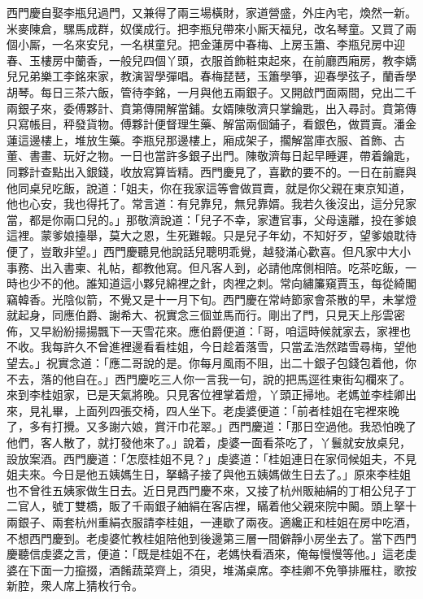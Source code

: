 西門慶自娶李瓶兒過門，又兼得了兩三場橫財，家道營盛，外庄內宅，煥然一新。米麥陳倉，騾馬成群，奴僕成行。把李瓶兒帶來小厮天福兒，改名琴童。又買了兩個小厮，一名來安兒，一名棋童兒。把金蓮房中春梅、上房玉簫、李瓶兒房中迎春、玉樓房中蘭香，一般兒四個丫頭，衣服首飾粧束起來，在前廳西廂房，教李嬌兒兄弟樂工李銘來家，教演習學彈唱。{}春梅琵琶，玉簫學箏，迎春學弦子，蘭香學胡琴。每日三茶六飯，管待李銘，一月與他五兩銀子。又開啟門面兩間，兌出二千兩銀子來，委傅夥計、賁第傳開解當鋪。女婿陳敬濟只掌鑰匙，出入尋討。賁第傳只寫帳目，秤發貨物。傅夥計便督理生藥、解當兩個鋪子，看銀色，做買賣。潘金蓮這邊樓上，堆放生藥。李瓶兒那邊樓上，廂成架子，擱解當庫衣服、首飾、古董、書畫、玩好之物。一日也當許多銀子出門。陳敬濟每日起早睡遲，帶着鑰匙，同夥計查點出入銀錢，收放寫算皆精。西門慶見了，喜歡的要不的。一日在前廳與他同桌兒吃飯，說道：「姐夫，你在我家這等會做買賣，就是你父親在東京知道，他也心安，我也得托了。常言道：有兒靠兒，無兒靠婿。我若久後沒出，這分兒家當，都是你兩口兒的。」{}那敬濟說道：「兒子不幸，家遭官事，父母遠離，投在爹娘這裡。蒙爹娘擡舉，莫大之恩，生死難報。只是兒子年幼，不知好歹，望爹娘耽待便了，豈敢非望。」西門慶聽見他說話兒聰明乖覺，越發滿心歡喜。但凡家中大小事務、出入書柬、礼帖，都教他寫。但凡客人到，必請他席側相陪。吃茶吃飯，一時也少不的他。誰知道這小夥兒綿裡之針，肉裡之刺。常向繡簾窺賈玉，每從綺閣竊韓香。光陰似箭，不覺又是十一月下旬。西門慶在常峙節家會茶散的早，未掌燈就起身，同應伯爵、謝希大、祝實念三個並馬而行。剛出了門，只見天上彤雲密佈，又早紛紛揚揚飄下一天雪花來。應伯爵便道：「哥，咱這時候就家去，家裡也不收。我每許久不曾進裡邊看看桂姐，今日趁着落雪，只當孟浩然踏雪尋梅，望他望去。」祝實念道：「應二哥說的是。你每月風雨不阻，出二十銀子包錢包着他，{}你不去，落的他自在。」西門慶吃三人你一言我一句，說的把馬逕徃東街勾欄來了。來到李桂姐家，已是天氣將晚。只見客位裡掌着燈，丫頭正掃地。老媽並李桂卿出來，見礼畢，上面列四張交椅，四人坐下。老虔婆便道：「前者桂姐在宅裡來晚了，多有打攪。又多謝六娘，賞汗巾花翠。」西門慶道：「那日空過他。我恐怕晚了他們，客人散了，就打發他來了。」說着，虔婆一面看茶吃了，丫鬟就安放桌兒，設放案酒。西門慶道：「怎麼桂姐不見？」虔婆道：「桂姐連日在家伺候姐夫，不見姐夫來。今日是他五姨媽生日，拏轎子接了與他五姨媽做生日去了。」原來李桂姐也不曾徃五姨家做生日去。近日見西門慶不來，又接了杭州販紬絹的丁相公兒子丁二官人，號丁雙橋，販了千兩銀子紬絹在客店裡，瞞着他父親來院中闝。頭上拏十兩銀子、兩套杭州重絹衣服請李桂姐，一連歇了兩夜。適纔正和桂姐在房中吃酒，不想西門慶到。老虔婆忙教桂姐陪他到後邊第三層一間僻靜小房坐去了。當下西門慶聽信虔婆之言，便道：「既是桂姐不在，老媽快看酒來，俺每慢慢等他。」這老虔婆在下面一力攛掇，酒餚蔬菜齊上，須臾，堆滿桌席。李桂卿不免箏排雁柱，歌按新腔，衆人席上猜枚行令。

